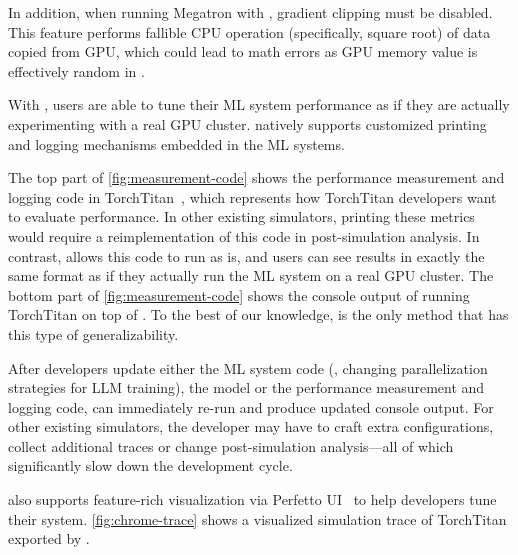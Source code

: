 In addition, when running Megatron \cite{shoeybi2019megatron} with \sys, gradient clipping must be disabled. This feature performs fallible CPU operation (specifically, square root) of data copied from GPU, which could lead to math errors as GPU memory value is effectively random in \sys.

With \sys, users are able to tune their ML system performance as if they are actually experimenting with a real GPU cluster. \sys natively supports customized printing and logging mechanisms embedded in the ML systems.

The top part of \autoref{fig:measurement-code} shows the performance measurement and logging code in TorchTitan~\cite{liang2025torchtitan}, which represents how TorchTitan developers want to evaluate performance. In other existing simulators, printing these metrics would require a reimplementation of this code in post-simulation analysis. In contrast, \sys allows this code to run as is, and users can see results in exactly the same format as if they actually run the ML system on a real GPU cluster. The bottom part of \autoref{fig:measurement-code} shows the console output of running TorchTitan on top of \sys. To the best of our knowledge, \sys is the only method that has this type of generalizability. 

After developers update either the ML system code (\eg, changing parallelization strategies for LLM training), the model or the performance measurement and logging code, \sys can immediately re-run and produce updated console output. For other existing simulators, the developer may have to craft extra configurations, collect additional traces or change post-simulation analysis---all of which significantly slow down the development cycle.

\sys also supports feature-rich visualization via Perfetto UI~\cite{perfetto} to help developers tune their system. \autoref{fig:chrome-trace} shows a visualized simulation trace of TorchTitan exported by \sys.

